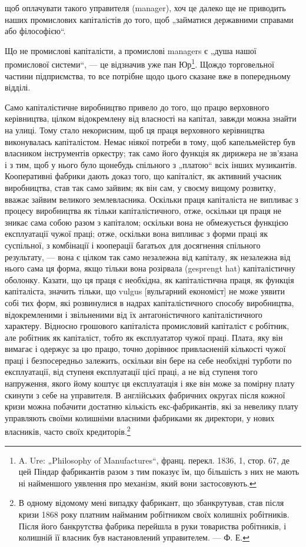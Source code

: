 \parcont{}  %
щоб оплачувати такого управителя (manager), хоч це далеко
ще не приводить наших промислових капіталістів до того, щоб
„займатися державними справами або філософією“.

Що не промислові капіталісти, а промислові managers є „душа
нашої промислової системи“, — це відзначив уже пан Юр\footnote{
A. Ure: „Philosophy of Manufactures“, франц. перекл. 1836, 1, стор. 67,
де цей Піндар фабрикантів разом з тим показує їм, що більшість з них не
мають ні найменшого уявлення про механізм, який вони застосовують.
}.
Щождо торговельної частини підприємства, то все потрібне
щодо цього сказане вже в попередньому відділі.

Само капіталістичне виробництво привело до того, що працю
верховного керівництва, цілком відокремлену від власності на капітал,
завжди можна знайти на улиці. Тому стало некорисним, щоб ця
праця верховного керівництва виконувалась капіталістом. Немає
ніякої потреби в тому, щоб капельмейстер був власником інструментів
оркестру; так само його функція як дирижера не зв’язана і з тим,
щоб у нього було щонебудь спільного з „платою“ всіх інших музикантів.
Кооперативні фабрики дають доказ того, що капіталіст, як
активний учасник виробництва, став так само зайвим; як він сам,
у своєму вищому розвитку, вважає зайвим великого землевласника.
Оскільки праця капіталіста не випливає з процесу виробництва
як тільки капіталістичного, отже, оскільки ця праця не
зникає сама собою разом з капіталом; оскільки вона не обмежується
функцією експлуатації чужої праці; отже, оскільки вона
випливає з форми праці як суспільної, з комбінації і кооперації
багатьох для досягнення спільного результату, — вона є цілком так
само незалежна від капіталу, як незалежна від нього сама ця форма,
якщо тільки вона розірвала (gesprengt hat) капіталістичну оболонку.
Казати, що ця праця є необхідна, як капіталістична праця,
як функція капіталіста, значить тільки, що vulgus [вульгарний
економіст] не може уявити собі тих форм, які розвинулися
в надрах капіталістичного способу виробництва, відокремленими
і звільненими від їх антагоністичного капіталістичного характеру.
Відносно грошового капіталіста промисловий капіталіст
є робітник, але робітник як капіталіст, тобто як експлуататор
чужої праці. Плата, яку він вимагає і одержує за цю працю,
точно дорівнює привласненій кількості чужої праці і безпосередньо
залежить, оскільки він бере на себе необхідні турботи по
експлуатації, від ступеня експлуатації цієї праці, а не від ступеня
того напруження, якого йому коштує ця експлуатація і яке він може
за помірну плату скинути з себе на управителя. В англійських
фабричних округах після кожної кризи можна побачити достатню
кількість екс-фабрикантів, які за невелику плату управляють
своїми колишніми власними фабриками як директори, у нових власників,
часто своїх кредиторів.\footnote{
В одному відомому мені випадку фабрикант, що збанкрутував, став після
кризи 1868 року платним найманим робітником своїх колишніх робітників. Після
його банкрутства фабрика перейшла в руки товариства робітників, і колишній
її власник був настановлений управителем. — Ф. Е.
}
